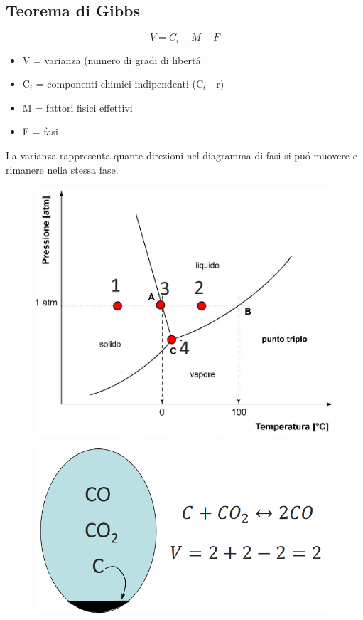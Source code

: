 \documentclass{article}
\begin{document}
{        \subsection{Teorema di Gibbs}
            \begin{equation*}
                V = C_i + M - F
            \end{equation*}
            \begin{itemize}
                \item V = varianza (numero di gradi di libert\'a
                \item C$_i$ = componenti chimici indipendenti (C$_t$ - r)
                \item M = fattori fisici effettivi
                \item F = fasi
            \end{itemize}
            La varianza rappresenta quante direzioni nel diagramma di fasi si pu\'o muovere e rimanere nella stessa fase.
            \begin{figure}[!h]
                \centering
                \includegraphics[width=.85\linewidth]{Punti di Variazione nel diagramma di stato dell'acqua.png}
            \end{figure}
            \begin{figure}[!h]
                \centering
                \includegraphics[width=.85\linewidth]{Esempio di variazione di un sistema chiuso.png}
            \end{figure}
}
\end{document}
